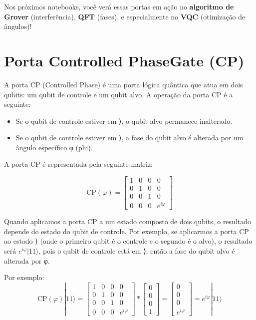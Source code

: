 \documentclass[
  brazilian,
]{report}
\providecommand{\tightlist}{%
  \setlength{\itemsep}{0pt}\setlength{\parskip}{0pt}}
\begin{document}
Nos próximos notebooks, você verá essas portas em ação no
\textbf{algoritmo de Grover} (interferência), \textbf{QFT} (fases), e
especialmente no \textbf{VQC} (otimização de ângulos)!

\section{Porta Controlled PhaseGate
(CP)}\label{porta-controlled-phasegate-cp}

A porta CP (Controlled Phase) é uma porta lógica quântica que atua em
dois qubits: um qubit de controle e um qubit alvo. A operação da porta
CP é a seguinte:

\begin{itemize}
\tightlist
\item
  Se o qubit de controle estiver em ⟩, o qubit alvo permanece
  inalterado.
\item
  Se o qubit de controle estiver em ⟩, a fase do qubit alvo é
  alterada por um ângulo específico φ (phi).
\end{itemize}

A porta CP é representada pela seguinte matriz:

\[
\text{CP}(φ) = 
\begin{bmatrix}
1 & 0 & 0 & 0 \\
0 & 1 & 0 & 0 \\
0 & 0 & 1 & 0 \\
0 & 0 & 0 & e^{iφ}
\end{bmatrix}
\]

Quando aplicamos a porta CP a um estado composto de dois qubits, o
resultado depende do estado do qubit de controle. Por exemplo, se
aplicarmos a porta CP ao estado ⟩ (onde o primeiro qubit é o
controle e o segundo é o alvo), o resultado será \(e^{iφ}|11⟩\), pois o
qubit de controle está em ⟩, então a fase do qubit alvo é
alterada por φ.

Por exemplo: \[
\text{CP}(φ)|11⟩ =
\begin{bmatrix}
1 & 0 & 0 & 0 \\
0 & 1 & 0 & 0 \\
0 & 0 & 1 & 0 \\
0 & 0 & 0 & e^{iφ}
\end{bmatrix} * 
\begin{bmatrix}
0 \\ 0 \\ 0 \\ 1
\end{bmatrix} =
\begin{bmatrix}
0 \\ 0 \\ 0 \\ e^{iφ}
\end{bmatrix} =
e^{iφ}|11⟩
\]
\end{document}
